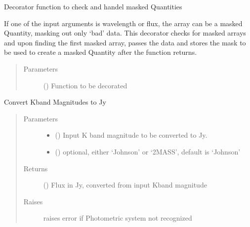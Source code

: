 \documentclass[a4paper,11pt,english]{sphinxmanual}
\begin{document}
\begin{fulllineitems}
\label{\detokenize{cascade.exoplanet_tools:cascade.exoplanet_tools.exoplanet_tools.masked_array_input}}
Decorator function to check and handel masked Quantities

If one of the input arguments is wavelength or flux, the array can be
a masked Quantity, masking out only ‘bad’ data. This decorator checks for
masked arrays and upon finding the first masked array, passes the data
and stores the mask to be used to create a masked Quantity after the
function returns.
\begin{quote}\begin{description}
\item[{Parameters}] \leavevmode
{} () \textendash{} Function to be decorated

\end{description}\end{quote}

\end{fulllineitems}


\begin{fulllineitems}
\label{\detokenize{cascade.exoplanet_tools:cascade.exoplanet_tools.exoplanet_tools.KmagToJy}}
Convert Kband Magnitudes to Jy
\begin{quote}\begin{description}
\item[{Parameters}] \leavevmode\begin{itemize}
\item {} 
 () \textendash{} Input K band magnitude to be converted to Jy.

\item {} 
 () \textendash{} optional, either ‘Johnson’ or ‘2MASS’, default is ‘Johnson’

\end{itemize}

\item[{Returns}] \leavevmode
{} () \textendash{} Flux in Jy, converted from input Kband magnitude

\item[{Raises}] \leavevmode
{} \textendash{} raises error if Photometric system not recognized

\end{description}\end{quote}

\end{fulllineitems}
\end{document}
